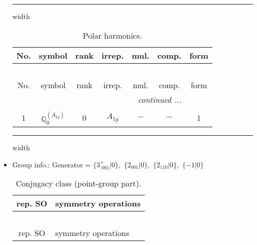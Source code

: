 \documentclass[fleqn,10pt,landscape]{article}
\begin{document}
\begin{itemize}
 \hfil \hrule height 1mm width \textwidth \hfil

\begin{center}
\renewcommand{\arraystretch}{1.3}
\begin{longtable}{ccccccc}
\caption{Polar harmonics.}
 \\
 \hline \hline
No. & symbol & rank & irrep. & mul. & comp. & form \\ \hline \endfirsthead

\multicolumn{6}{l}{\tablename\ \thetable{}} \\
 \hline \hline
No. & symbol & rank & irrep. & mul. & comp. & form \\ \hline \endhead

 \hline \hline
\multicolumn{6}{r}{\footnotesize\it continued ...} \\ \endfoot

 \hline \hline
\multicolumn{6}{r}{} \\ \endlastfoot

$ 1 $ & $ \mathbb{Q}_{0}^{(A_{1g})} $ & $ 0 $ & $ A_{1g} $ & $ - $ & $ - $ & $ 1 $ \\
\end{longtable}
\end{center}

 \hfil \hrule height 1mm width \textwidth \hfil

\item Group info.: Generator = $\{3^{+}_{\,\,001}|0\},\,\,\{2{}_{001}|0\},\,\,\{2{}_{110}|0\},\,\,\{-1|0\}$

\begin{center}
\renewcommand{\arraystretch}{1.3}
\begin{longtable}{c|l}
\caption{Conjugacy class (point-group part).}
 \\
 \hline \hline
rep. SO & symmetry operations \\ \hline \endfirsthead

\multicolumn{1}{l}{\tablename\ \thetable{}} \\
 \hline \hline
rep. SO & symmetry operations \\ \hline \endhead


\end{longtable}
\end{center}
\end{itemize}
\end{document}
